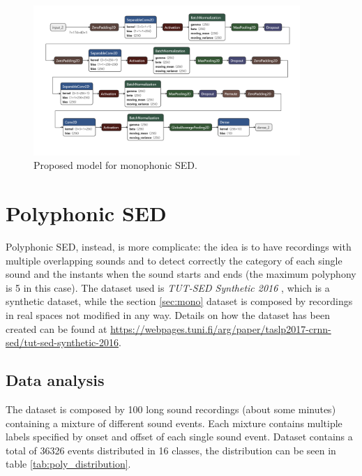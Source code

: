 \documentclass{article}
\begin{document}
\begin{figure}[H]
	\centering
	\includegraphics[width=0.9\textwidth]{./images/mono/new_model.png}	
	\caption{Proposed model for monophonic SED.}
	\label{fig:mono_new_model}
\end{figure}


\section{Polyphonic SED}
\label{sec:poly}

Polyphonic SED, instead, is more complicate: the idea is to have recordings with multiple overlapping sounds and to detect correctly the category of each single sound and the instants when the sound starts and ends (the maximum polyphony is 5 in this case). The dataset used is \textit{TUT-SED Synthetic 2016} \cite{Cakir_2017}, which is a synthetic dataset, while the section \ref{sec:mono} dataset is composed by recordings in real spaces not modified in any way. Details on how the dataset has been created can be found at \url{https://webpages.tuni.fi/arg/paper/taslp2017-crnn-sed/tut-sed-synthetic-2016}.

\subsection{Data analysis}
\label{subsec:poly_analysis}

The dataset is composed by 100 long sound recordings (about some minutes) containing a mixture of different sound events. Each mixture contains multiple labels specified by onset and offset of each single sound event. Dataset contains a total of 36326 events distributed in 16 classes, the distribution can be seen in table \ref{tab:poly_distribution}.
\end{document}

